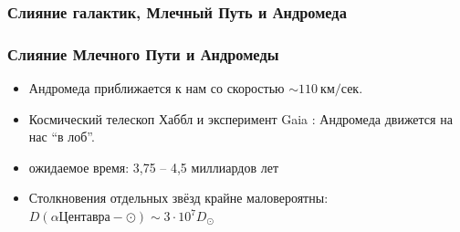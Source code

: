 \documentclass[aspectratio=169]{beamer}
\begin{document}
\begin{frame}
\frametitle{Слияние галактик, Млечный Путь и Андромеда}
\end{frame}

\begin{frame}
\frametitle{Слияние Млечного Пути и Андромеды}
\begin{itemize}
\item Андромеда приближается к нам со скоростью $\sim 110 \: \text{км}/\text{сек}$.
\item Космический телескоп Хаббл \cite{arXiv:1205.6864} и
      эксперимент Gaia \cite{arXiv:1805.04079}:
      Андромеда движется на нас ``в лоб''.
\item ожидаемое время: 3,75 -- 4,5 миллиардов лет
\item Столкновения отдельных звёзд крайне маловероятны:
      $D(\alpha \text{Центавра}- \odot) \sim 3 \cdot 10^7 D_\odot$
\end{itemize}
\end{frame}
\end{document}
